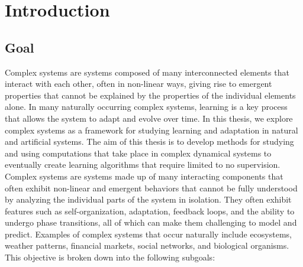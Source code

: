 \chapter{Introduction}
\label{cha:introduction}

\section{Goal}

Complex systems are systems composed of many interconnected elements that 
interact with each other, often in non-linear ways, giving rise to emergent 
properties that cannot be explained by the properties of the individual 
elements alone. In many naturally occurring complex systems, learning is a key process that 
allows the system to adapt and evolve over time. 
In this thesis, we explore complex systems
as a framework for studying learning and adaptation in natural and artificial
systems. The aim of this thesis is to develop methods for studying and using
computations that take place in complex dynamical systems to eventually create
learning algorithms that require limited to no supervision. 
Complex systems are systems made up of many interacting components that often 
exhibit non-linear and emergent behaviors that cannot be fully understood by 
analyzing the individual parts of the system in isolation. They often exhibit 
features such as self-organization, adaptation, feedback loops, and the ability
to undergo phase transitions, all of which can make them challenging to model and 
predict. Examples of complex systems that occur naturally include ecosystems, weather patterns, financial 
markets, social networks, and biological organisms.
This objective is broken down into the following subgoals:

